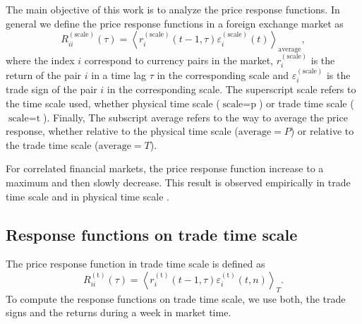 The main objective of this work is to analyze the price response functions. In
general we define the price response functions in a foreign exchange market as
\begin{equation}\label{eq:response_general}
    R^{\left(\textrm{scale}\right)}_{ii}\left(\tau\right)=\left\langle
    r^{\left(\textrm{scale}\right)}_{i}\left(t-1, \tau\right)
    \varepsilon^{\left(\textrm{scale}\right)}_{i} \left(t\right)\right\rangle
    _{\textrm{average}},
\end{equation}
where the index $i$ correspond to currency pairs in the market,
$r^{\left(\textrm{scale}\right)}_{i}$ is the return of the pair $i$ in a time
lag $\tau$ in the corresponding scale and
$\varepsilon^{\left(\textrm{scale}\right)}_{i}$ is the trade sign of the pair
$i$ in the corresponding scale. The superscript scale refers to the time scale
used, whether physical time scale ($\textrm{scale} = \textrm{p}$) or trade time
scale ($\textrm{scale} = \textrm{t}$). Finally, The subscript average refers to
the way to average the price response, whether relative to the physical time
scale ($\textrm{average} = P$) or relative to the trade time scale
($\textrm{average} = T$).

For correlated financial markets, the price response function increase to a
maximum and then slowly decrease. This result is observed empirically in trade
time scale and in physical time scale
\cite{my_paper_response_financial,Wang_2016_avg}.

\subsection{Response functions on trade time scale}
\label{subsec:response_function_trade}

The price response function in trade time scale is defined as
\cite{my_paper_response_financial}
\begin{equation}\label{eq:response_functions_trade_scale_general}
    R^{\left(\textrm{t}\right)}_{ii}\left(\tau\right)=\left\langle
    r^{\left(\textrm{t}\right)}_{i}\left(t-1,\tau \right)
    \varepsilon_{i}^{\left(\textrm{t}\right)}
    \left(t, n\right)\right\rangle _{T}.
\end{equation}
To compute the response functions on trade time scale, we use both, the trade
signs and the returns during a week in market time.

